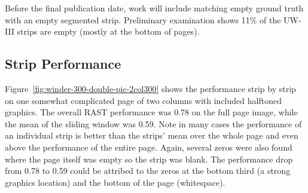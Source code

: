 \documentclass[conference]{IEEEtran}
\begin{document}
Before the final publication date, work will include matching empty ground
truth with an empty segmented strip. Preliminary examination shows 11\% of the
UW-III strips are empty (mostly at the bottom of pages).

%
%

%
%
%
%
%
%
%
%
%
%
%
%

%
%
\subsection{Strip Performance}

Figure~\ref{fig:winder-300-double-pic-2col300} shows the performance strip by
strip on one somewhat complicated page of two columns with included halftoned
graphics.  The overall RAST performance was 0.78 on the full page image, while
the mean of the sliding window was 0.59.  Note in many cases the performance of
an individual strip is better than the strips' mean over the whole page and
even above the performance of the entire page.  Again, several zeros were also
found where the page itself was empty so the strip was blank. The performance
drop from 0.78 to 0.59 could be attribed to the zeros at the bottom third (a
strong graphics location) and the bottom of the page (whitespace).
\end{document}
